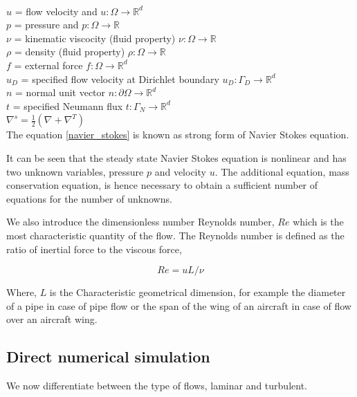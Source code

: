 \documentclass[a4paper]{book}
\begin{document}
$ $\\
$u$ = flow velocity and $u:\Omega \rightarrow \mathbb{R}^d$ \\
$p$ = pressure and $p:\Omega \rightarrow \mathbb{R}$\\
$\nu$ = kinematic viscocity (fluid property) $\nu:\Omega \rightarrow \mathbb{R}$\\ 
$\rho$ = density (fluid property) $\rho:\Omega \rightarrow \mathbb{R}$\\
$f$ = external force $f:\Omega \rightarrow \mathbb{R}^d$\\
$u_D$ = specified flow velocity at Dirichlet boundary $u_D:\Gamma_D \rightarrow \mathbb{R}^d$\\
$n$ = normal unit vector $n:\partial \Omega \rightarrow \mathbb{R}^d$\\
$t$ = specified Neumann flux $t:\Gamma_N \rightarrow \mathbb{R}^d$\\
$\nabla^s = \frac{1}{2}(\nabla + \nabla^T)$\\


The equation \eqref{navier_stokes} is known as strong form of Navier Stokes equation.

It can be seen that the steady state Navier Stokes equation is nonlinear and has two unknown variables, pressure $p$ and velocity $u$. The additional equation, mass conservation equation, is hence necessary to obtain a sufficient number of equations for the number of unknowns.

We also introduce the dimensionless number Reynolds number, $Re$ which is the most characteristic quantity of the flow. The Reynolds number is defined as the ratio of inertial force to the viscous force,

\begin{equation} \label{reynolds_number}
Re =  u L / \nu
\end{equation}

Where, $L$ is the Characteristic geometrical dimension, for example the diameter of a pipe in case of pipe flow or the span of the wing of an aircraft in case of flow over an aircraft wing.\\

\subsection[DNS]{Direct numerical simulation} 

We now differentiate between the type of flows, laminar and turbulent.\\
\end{document}
